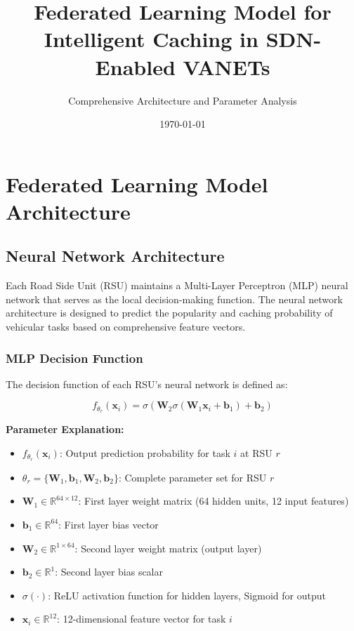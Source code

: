 \documentclass[11pt]{article}
\title{Federated Learning Model for Intelligent Caching in SDN-Enabled VANETs}
\author{Comprehensive Architecture and Parameter Analysis}
\date{\today}
\begin{document}
\maketitle

\section{Federated Learning Model Architecture}

\subsection{Neural Network Architecture}

Each Road Side Unit (RSU) maintains a Multi-Layer Perceptron (MLP) neural network that serves as the local decision-making function. The neural network architecture is designed to predict the popularity and caching probability of vehicular tasks based on comprehensive feature vectors.

\subsubsection{MLP Decision Function}

The decision function of each RSU's neural network is defined as:

\begin{equation}
f_{\theta_r}(\mathbf{x}_i) = \sigma(\mathbf{W}_2 \sigma(\mathbf{W}_1 \mathbf{x}_i + \mathbf{b}_1) + \mathbf{b}_2)
\label{eq:mlp_model}
\end{equation}

\textbf{Parameter Explanation:}
\begin{itemize}
    \item $f_{\theta_r}(\mathbf{x}_i)$: Output prediction probability for task $i$ at RSU $r$
    \item $\theta_r = \{\mathbf{W}_1, \mathbf{b}_1, \mathbf{W}_2, \mathbf{b}_2\}$: Complete parameter set for RSU $r$
    \item $\mathbf{W}_1 \in \mathbb{R}^{64 \times 12}$: First layer weight matrix (64 hidden units, 12 input features)
    \item $\mathbf{b}_1 \in \mathbb{R}^{64}$: First layer bias vector
    \item $\mathbf{W}_2 \in \mathbb{R}^{1 \times 64}$: Second layer weight matrix (output layer)
    \item $\mathbf{b}_2 \in \mathbb{R}^{1}$: Second layer bias scalar
    \item $\sigma(\cdot)$: ReLU activation function for hidden layers, Sigmoid for output
    \item $\mathbf{x}_i \in \mathbb{R}^{12}$: 12-dimensional feature vector for task $i$
\end{itemize}
\end{document}
